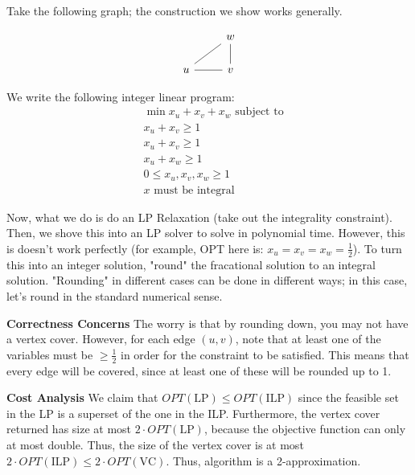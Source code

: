 \begin{algothm}
    Take the following graph; the construction we show works generally.

    \[\begin{tikzcd}
        & w \\
        u & v
        \arrow[no head, from=1-2, to=2-1]
        \arrow[no head, from=1-2, to=2-2]
        \arrow[no head, from=2-1, to=2-2]
    \end{tikzcd}\]

    We write the following integer linear program:
    \begin{align*}
        &\min x_u + x_v + x_w \text{ subject to}\\
        &x_u + x_v \geq 1 \\
        &x_u + x_v \geq 1 \\
        &x_u + x_w \geq 1 \\
        &0 \leq x_u, x_v, x_w \geq 1 \\
        &\text{$x$ must be integral}
    \end{align*}

    Now, what we do is do an LP Relaxation (take out the integrality constraint). Then, we shove this into an LP solver to solve in polynomial time.
    However, this is doesn't work perfectly (for example, OPT here is: $x_u = x_v = x_w = \frac12$). To turn this into an integer solution,
    "round" the fracational solution to an integral solution. "Rounding" in different cases can be done in different ways; in this case, let's round in the standard numerical sense.

    \textbf{Correctness Concerns} The worry is that by rounding down, you may not have a vertex cover. However, for each edge $(u, v)$, note that at least one of the variables must be $\geq \frac{1}{2}$ in order for the
    constraint to be satisfied. This means that every edge will be covered, since at least one of these will be rounded up to 1.

    \textbf{Cost Analysis} We claim that $OPT(\text{LP}) \leq OPT(\text{ILP})$ since the feasible set in the LP is a superset of the one in the ILP. Furthermore, the vertex cover returned has size at most $2 \cdot OPT(\text{LP})$, because the objective
    function can only at most double. Thus, the size of the vertex cover is at most $2 \cdot OPT(\text{ILP}) \leq 2 \cdot OPT(\text{VC})$. Thus, algorithm is a 2-approximation.
\end{algothm}

